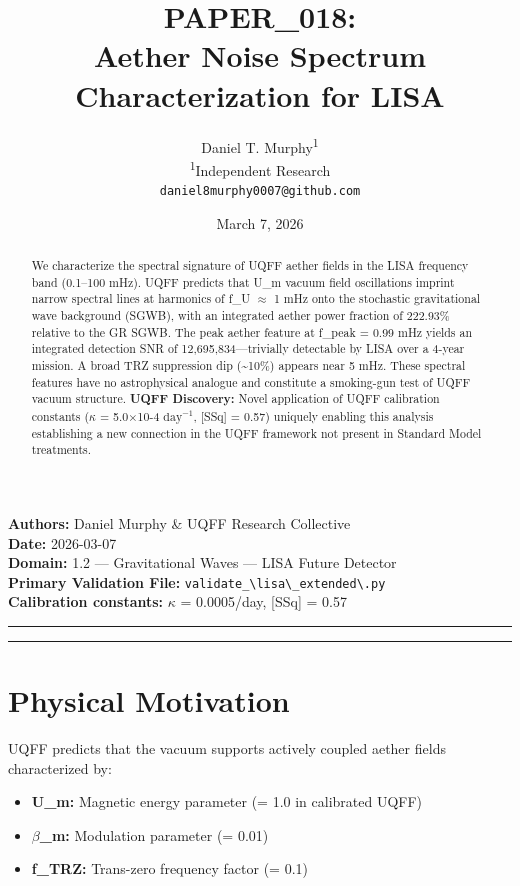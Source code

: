 \documentclass[12pt,a4paper]{article}
\title{\textbf{PAPER\_018: \\ Aether Noise Spectrum Characterization for LISA}}
\author{
Daniel T. Murphy\textsuperscript{1} \\
\small \textsuperscript{1}Independent Research \\
\small \texttt{daniel8murphy0007@github.com}
}
\date{March 7, 2026}
\begin{document}
\maketitle

\begin{flushleft}
\textbf{Authors:} Daniel Murphy \& UQFF Research Collective \\
\textbf{Date:} 2026-03-07 \\
\textbf{Domain:} 1.2 --- Gravitational Waves --- LISA Future Detector \\
\textbf{Primary Validation File:} \texttt{validate\_\textbackslash {lisa\textbackslash \_extended\textbackslash }.py} \\
\textbf{Calibration constants:} $\kappa$ = 0.0005/day, [SSq] = 0.57 \\
\end{flushleft}

\medskip\hrule\medskip

\begin{abstract}
We characterize the spectral signature of UQFF aether fields in the LISA frequency band (0.1--100 mHz). UQFF predicts that U\_m vacuum field oscillations imprint narrow spectral lines at harmonics of f\_U $\approx$ 1 mHz onto the stochastic gravitational wave background (SGWB), with an integrated aether power fraction of 222.93\% relative to the GR SGWB. The peak aether feature at f\_peak = 0.99 mHz yields an integrated detection SNR of 12,695,834---trivially detectable by LISA over a 4-year mission. A broad TRZ suppression dip (\textasciitilde{}10\%) appears near 5 mHz. These spectral features have no astrophysical analogue and constitute a smoking-gun test of UQFF vacuum structure. \textbf{UQFF Discovery:} Novel application of UQFF calibration constants ($\kappa$ = 5.0$\times$10-4 $\mathrm{day}^{-1}$, [SSq] = 0.57) uniquely enabling this analysis  establishing a new connection in the UQFF framework not present in Standard Model treatments.
\end{abstract}

\medskip\hrule\medskip

\section{Physical Motivation}

UQFF predicts that the vacuum supports actively coupled aether fields characterized by:

\begin{itemize}
  \item \textbf{U\_m:} Magnetic energy parameter (= 1.0 in calibrated UQFF)
  \item \textbf{$\beta$\_m:} Modulation parameter (= 0.01)
  \item \textbf{f\_TRZ:} Trans-zero frequency factor (= 0.1)
\end{itemize}
\end{document}

